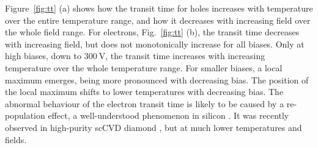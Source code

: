 Figure~\ref{fig:tt} (a) shows how the transit time for holes increases with temperature over the entire temperature range,
 and how it decreases with increasing field over the whole field range. 
For electrons, Fig.~\ref{fig:tt} (b), the transit time decreases with increasing field, but does not monotonically increase for all biases. 
Only at high biases, down to $\SI{300}{\volt}$, the transit time increases with increasing temperature over the whole temperature range.
For smaller biases, a local maximum emerges, being more pronounced with decreasing bias.
The position of the local maximum shifts to lower temperatures with decreasing bias.
The abnormal behaviour of the electron transit time is likely to be caused by a re-population effect, a well-understood phenomenon in silicon \cite{Jacoboni197777}.
It was recently observed in high-purity scCVD diamond \cite{isberg:172103}, but at much lower temperatures and fields. 



 
